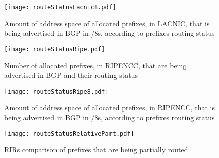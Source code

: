 \documentclass[11pt,a4paper]{scrreprt}
\begin{document}
\begin{figure}[!h]
\centering
\texttt{[image: routeStatusLacnic8.pdf]}
\caption{Amount of address space of allocated prefixes, in LACNIC, that is being advertised in BGP in /8s, according to prefixes routing status}
\label{fig:routingStatusLacnic8}
\end{figure}



\begin{figure}[ht!]
\centering
\texttt{[image: routeStatusRipe.pdf]}
\caption{Number of allocated prefixes, in RIPENCC, that are being advertised in BGP and their routing status}
\label{fig:routingStatusRipe}
\end{figure}

\begin{figure}[ht!]
\centering
\texttt{[image: routeStatusRipe8.pdf]}
\caption{Amount of address space of allocated prefixes, in RIPENCC, that is being advertised in BGP in /8s, according to prefixes routing status}
\label{fig:routingStatusRipe8}
\end{figure}


\begin{figure}[!h]
\centering
\texttt{[image: routeStatusRelativePart.pdf]}
\caption{RIRs comparison of prefixes that are being partially routed}
\label{fig:routingStatusRelativePart}
\end{figure}

\end{document}
